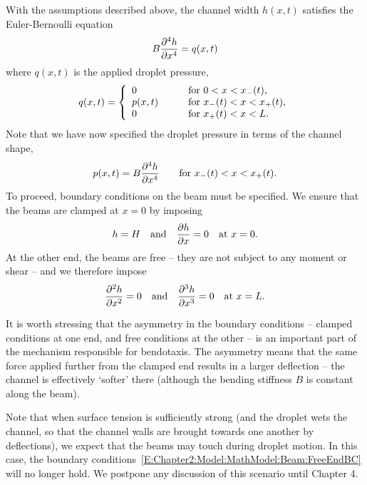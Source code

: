 With the assumptions described above, the channel width $h(x,t)$ satisfies the Euler-Bernoulli equation
\begin{equation}\label{E:Chapter2:Model:MathModel:Beam:EulerBernoulli}
B\frac{\partial ^4 h}{\partial x^4} = q(x,t)
\end{equation}
where $q(x,t)$ is the applied droplet pressure,
\begin{equation}\label{E:Chapter2:Model:MathModel:Beam:EulerBernoulliAppliedPressure}
q(x,t) =\left\{ \begin{array}{l l}
0 & \qquad \text{for}~ 0 < x < x_{-}(t),\\
p(x,t) & \qquad\text{for}~ x_{-}(t)< x < x_{+}(t),\\
0 & \qquad \text{for}~ x_{+}(t) < x < L.
\end{array}\right.
\end{equation}
Note that we have now specified the droplet pressure in terms of the channel shape,
\begin{equation}\label{E:Chapter2:Model:MathModel:Beam:Pressure2Channel}
p(x,t) = B\frac{\partial ^4 h}{\partial x^4} \qquad \text{for}~x_{-}(t) < x < x_{+}(t).
\end{equation}
To proceed, boundary conditions on the beam must be specified. We ensure that the beams are clamped at $x = 0$ by imposing
\begin{equation}\label{E:Chapter2:Model:MathModel:Beam:ClampedEndBC}
h = H\quad \text{and} \quad  \frac{\partial h}{\partial x} = 0 \quad \text{at}~x = 0.
\end{equation}
At the other end, the beams are free -- they are not subject to any moment or shear -- and we therefore impose
\begin{equation}\label{E:Chapter2:Model:MathModel:Beam:FreeEndBC}
\frac{\partial ^2 h}{\partial x^2} = 0 \quad \text{and} \quad  \frac{\partial ^3 h}{\partial x^3}= 0   \quad \text{at}~x = L.
\end{equation}

It is worth stressing that the asymmetry in the boundary conditions -- clamped conditions at one end, and free conditions at the other -- is an important part of the mechanism responsible for bendotaxis. The asymmetry means that the same force applied further from the clamped end results in a larger deflection -- the channel is effectively `softer' there (although the bending stiffness $B$ is constant along the beam).

Note that when surface tension is sufficiently strong (and the droplet wets the channel, so that the channel walls are brought towards one another by deflections), we expect that the beams may touch during droplet motion. In this case, the boundary conditions~\eqref{E:Chapter2:Model:MathModel:Beam:FreeEndBC} will no longer hold. We postpone any discussion of this scenario until Chapter 4.


